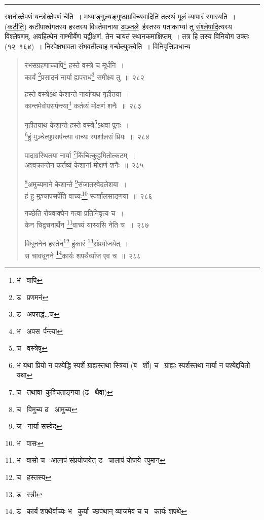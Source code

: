 \documentclass[11pt, openany]{book}
\begin{document}
\hrule

\vspace{2mm}
\noindent
रशनोत्क्षेपणं यन्त्रोत्क्षेपणं चेति~। \underline{मध्याङ्गुल्यङ्गुष्ठाग्रविच्यवा}दिति तत्स्थं मूलं व्यापारं स्मारयति~। (\underline{कटीति}) कटीपार्श्वगतस्य हस्तस्य विवर्तमानाया \underline{अञ्जले}\textendash\ र्हस्तस्य पताकाभ्यां तु \underline{संश्लेषादि}त्यस्य विश्लेषणम्, अवहित्थेन गाम्भीर्येण यद्वीक्षणं, तेन चायतं स्थानकमाक्षिप्तम्~। तत्र हि तस्य विनियोग उक्तः (१२\textendash\ १६४)~। निरपेक्षभावता संभवतीत्याह गच्छेत्युक्त्वेति~। विनिवृत्तिप्राधान्य\textendash

\newpage

\begin{quote}
{\na रभसग्रहणाच्चापि\renewcommand{\thefootnote}{1}\footnote{भ \textendash\  वापि} हस्ते वस्त्रे च मूर्धनि~। \\
कार्यं \renewcommand{\thefootnote}{2}\footnote{ड \textendash\  प्रणमनं}प्रसादनं नार्या ह्यपराधं\renewcommand{\thefootnote}{3}\footnote{ड \textendash\  अपराद्धं\ldots च} समीक्ष्य तु~॥~२८२ 

हस्ते वस्त्रेऽथ केशान्ते नार्याप्यथ गृहीतया~। \\
कान्तमेवोपसर्पन्त्या\renewcommand{\thefootnote}{4}\footnote{भ \textendash\  अपस\textendash\ र्पन्त्या} कर्तव्यं मोक्षणं शनैः~॥~२८३ 

गृहीतयाथ केशान्ते हस्ते वस्त्रे\renewcommand{\thefootnote}{5}\footnote{च \textendash\  वस्त्रेषु}ऽथवा पुनः~।\\
\renewcommand{\thefootnote}{6}\footnote{भ यथा प्रियो न पश्येद्धि स्पर्शे ग्राह्यस्तथा स्त्रिया (ब \textendash\  र्शो) च \textendash\  ग्राह्यः स्पर्शस्तथा नार्या न पश्येद्दयितो यथा}हुं मुञ्चेत्युपसर्पन्त्या वाच्यः स्पर्शालसं प्रियः~॥~२८४ 

पादाग्रस्थितया नार्या \renewcommand{\thefootnote}{7}\footnote{च \textendash\  तथावा\textendash\ कुञ्चिताङ्गया (ढ \textendash\  थैवा)}किंचित्कुट्ठमितोत्कटम्~। \\
अश्वक्रान्तेन कर्तव्यं केशानां मोक्षणं शनैः~॥~२८५ 

\renewcommand{\thefootnote}{8}\footnote{च \textendash\  विमुच्य ढ \textendash\  आमुच्य}अमुच्यमाने केशान्ते \renewcommand{\thefootnote}{9}\footnote{ज \textendash\  नार्या सस्वेद}संजातस्वेदलेशया~।\\
हं हु मुञ्चापसर्पेति वाच्यः\renewcommand{\thefootnote}{10}\footnote{भ \textendash\  वासः} स्पर्शालसाङ्गया~॥~२८६ 

गच्छेति रोषवाक्येन गत्वा प्रतिनिवृत्य च~।\\
केन चिद्वचनार्थेन \renewcommand{\thefootnote}{11}\footnote{भ \textendash\  वासो च \textendash\  आलापं संप्रयोजयेत् ड \textendash\  चालापं योजये\textendash\ त्पुमान्}वाच्यं यास्यसि नेति च~॥~२८७ 

विधूननेन हस्तेन\renewcommand{\thefootnote}{12}\footnote{च \textendash\  हस्तस्य} हुंकारं \renewcommand{\thefootnote}{13}\footnote{ड \textendash\  स्त्री}संप्रयोजयेत्~।\\
स चावधूनने \renewcommand{\thefootnote}{14}\footnote{ड \textendash\  कार्यं शपथैर्वाच्यः भ \textendash\  कुर्या\textendash\ च्छपथान् व्याजमेव च च \textendash\  कार्यः शपथे}कार्यः शपथैर्व्याज एव च~॥~२८८ }
\end{quote}
\end{document}
